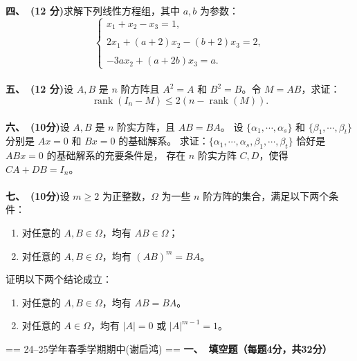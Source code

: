 \textbf{四、\ (12 分)}求解下列线性方程组，其中 $a, b$ 为参数：
$$\begin{cases}
x_{1}+x_{2}-x_{3}=1, \\ \\
2x_{1}+(a+2)x_{2}-(b+2) x_{3}=2, \\ \\
-3ax_{2}+(a+2b)x_{3}=a.
\end{cases}$$
\\
\textbf{五、\ (12 分)}设 $A, B$ 是 $n$ 阶方阵且 $A^{2}=A$ 和 $B^{2}=B$。令 $M=AB$，求证：
$$\operatorname{rank}(I_{n}-M) \leq 2(n-\operatorname{rank}(M)).$$
\\
\textbf{六、\ (10分)}设 $A, B$ 是 $n$ 阶实方阵，且 $AB=BA$。
设 $\{\alpha_{1}, \cdots, \alpha_{s}\}$ 和 $\{\beta_{1}, \cdots, \beta_{t}\}$分别是 $Ax=0$ 和 $Bx=0$ 的基础解系。
求证：$\{\alpha_{1}, \cdots, \alpha_{s}, \beta_{1}, \cdots, \beta_{t}\}$ 恰好是 $ABx=0$ 的基础解系的充要条件是，
存在 $n$ 阶实方阵 $C, D$，使得 $CA+DB=I_{n}$。
\\ \\
\textbf{七、\ (10分)}设 $m \geq 2$ 为正整数，$\Omega$ 为一些 $n$ 阶方阵的集合，满足以下两个条件：
\begin{enumerate}[label=(\roman*)]
\item 对任意的 $A, B \in \Omega$，均有 $AB \in \Omega$；
\item 对任意的 $A, B \in \Omega$，均有 $(AB)^{m}=BA$。
\end{enumerate}
证明以下两个结论成立：
\begin{enumerate}[label=(\arabic*)]
\item 对任意的 $A, B \in \Omega$，均有 $AB=BA$。
\item 对任意的 $A \in \Omega$，均有 $|A|=0$ 或 $|A|^{m-1}=1$。
\end{enumerate}



== 24--25学年春季学期期中(谢启鸿) ==
\textbf{一、\ 填空题（每题4分，共32分）}

